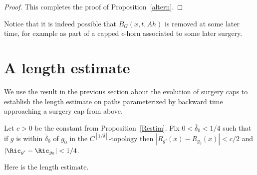 \begin{proof}
This completes the proof of Proposition~\ref{altern}.
\end{proof}


\begin{remark}
\label{rem:ball-removed-by-later-surgery}
Notice that it is indeed possible that $B_{G}(x,t,Ah)$ is removed at
some later time, for example as part of a capped  $\epsilon$-horn
associated to some later surgery.
\end{remark}

\section{A length estimate}

We use the result in the previous section about the evolution of
surgery caps to establish the length estimate on paths parameterized
by backward time approaching a surgery cap from above.

\begin{definition}
\label{def:overline-delta-0}\label{defnoverlinedelta0}
Let $c>0$ be the constant from Proposition~\ref{Restim}. Fix
$0<\overline\delta_0<1/4$ such that if $g$ is within
$\overline\delta_0$ of $g_0$ in the $C^{[1/\overline
\delta]}$-topology then $|R_{g'}(x)-R_{g_0}(x)|<c/2$ and $|\Ric_{g'}-\Ric_{g_0}|<1/4$.
\end{definition}


Here is the length estimate.



